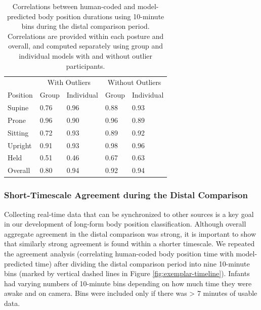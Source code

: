 \documentclass[
  man]{apa6}
\begin{document}
\begin{table}[tbp]

\begin{center}
\begin{threeparttable}

\caption{\label{tab:pt2binstable}Correlations between human-coded and model-predicted body position durations using 10-minute bins during the distal comparison period. Correlations are provided within each posture and overall, and computed separately using group and individual models with and without outlier participants.}

\begin{tabular}{lllll}
\toprule
 & \multicolumn{2}{c}{With Outliers} & \multicolumn{2}{c}{Without Outliers} \\
\cmidrule(r){2-3} \cmidrule(r){4-5}
Position & Group & Individual & Group & Individual\\
\midrule
Supine & 0.76 & 0.96 & 0.88 & 0.93\\
Prone & 0.96 & 0.90 & 0.96 & 0.89\\
Sitting & 0.72 & 0.93 & 0.89 & 0.92\\
Upright & 0.91 & 0.93 & 0.98 & 0.96\\
Held & 0.51 & 0.46 & 0.67 & 0.63\\ \midrule
Overall & 0.80 & 0.94 & 0.92 & 0.94\\
\bottomrule
\end{tabular}

\end{threeparttable}
\end{center}

\end{table}

\hypertarget{short-timescale-agreement-during-the-distal-comparison}{%
\subsubsection{Short-Timescale Agreement during the Distal Comparison}\label{short-timescale-agreement-during-the-distal-comparison}}

Collecting real-time data that can be synchronized to other sources is a key goal in our development of long-form body position classification. Although overall aggregate agreement in the distal comparison was strong, it is important to show that similarly strong agreement is found within a shorter timescale. We repeated the agreement analysis (correlating human-coded body position time with model-predicted time) after dividing the distal comparison period into nine 10-minute bins (marked by vertical dashed lines in Figure \ref{fig:exemplar-timeline}). Infants had varying numbers of 10-minute bins depending on how much time they were awake and on camera. Bins were included only if there was \textgreater{} 7 minutes of usable data.
\end{document}
